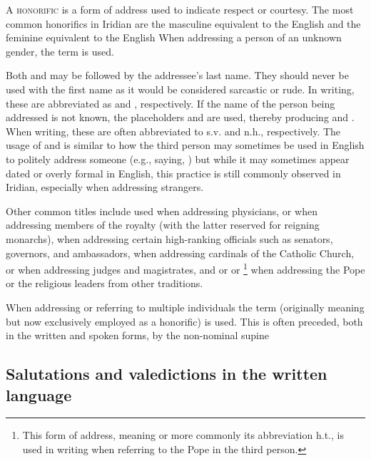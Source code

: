 A {\scshape honorific} is a form of address used to indicate respect or courtesy. The most common honorifics in
Iridian are the masculine  equivalent to the English  and the feminine
 equivalent to the English  When addressing a person of an unknown
gender, the term  is used.

Both  and  may be followed by the addressee's last name. They should never be used with
the first name as it would be considered sarcastic or rude. In writing, these are abbreviated as 
and , respectively. If the name of the person being addressed is not
known, the placeholders  and  are used, thereby producing 
and . When writing, these are often abbreviated to {\sc s.v.} and {\sc n.h.}, respectively.
The usage of  and  is similar to how the third person may sometimes be used
in English to politely address someone (e.g., saying, ) but while
it may sometimes appear dated or overly formal in English, this practice is still commonly observed
in Iridian, especially when addressing strangers.

Other common titles include  used when addressing physicians,  or 
when addressing members of the royalty (with the latter reserved for reigning monarchs),  when
addressing certain high-ranking officials such as senators, governors, and ambassadors,  when addressing
cardinals of the Catholic Church,  or  when addressing judges and magistrates, and
 or  or \footnote{This form of address, meaning
 or more commonly its abbreviation {\sc h.t.}, is used in writing when referring to the Pope in the
third person.} when addressing the Pope or the religious leaders from other traditions.

When addressing or referring to multiple individuals the term  (originally meaning 
but now exclusively employed as a honorific) is used. This is often preceded, both in the written and spoken forms,
by the non-nominal supine 

\subsection{Salutations and valedictions in the written language}

